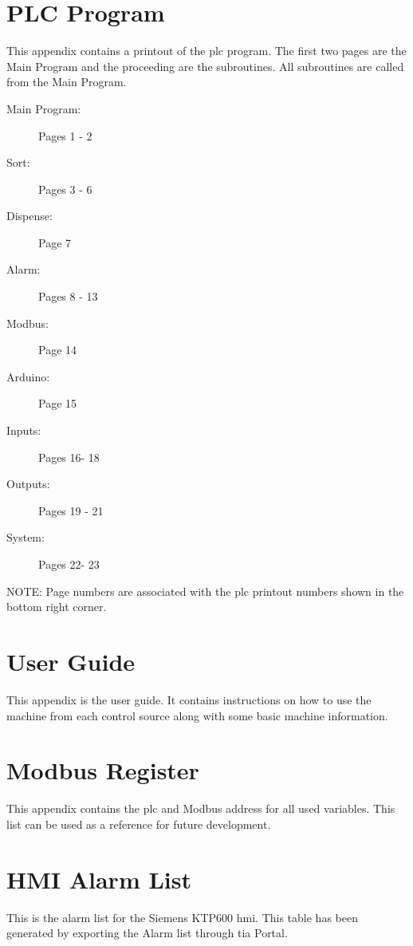 \appendix

\chapter{PLC Program}  \label{app:plcProg}
    This appendix contains a printout of the \acrshort{plc} program. The first two pages are the Main Program and the proceeding are the subroutines. All subroutines are called from the Main Program.

    \begin{description}
        \item[Main Program:] Pages 1 - 2
        \item[Sort:] Pages 3 - 6
        \item[Dispense:] Page 7
        \item[Alarm:] Pages 8 - 13
        \item[Modbus:] Page 14
        \item[Arduino:] Page 15
        \item[Inputs:] Pages 16- 18
        \item[Outputs:] Pages 19 - 21
        \item[System:] Pages 22- 23
    \end{description}

    NOTE: Page numbers are associated with the \acrshort{plc} printout numbers shown in the bottom right corner. 
    
     

\chapter{User Guide} \label{app:userGuide}
    This appendix is the user guide. It contains instructions on how to use the machine from each control source along with some basic machine information.
    

\chapter{Modbus Register} \label{app:modbusRegister}
    This appendix contains the \acrshort{plc} and Modbus address for all used variables. This list can be used as a reference for future development.
    

\chapter{HMI Alarm List} \label{app:alarmList}
    This is the alarm list for the Siemens KTP600 \acrshort{hmi}. This table has been generated by exporting the Alarm list through \acrshort{tia} Portal. 
    

